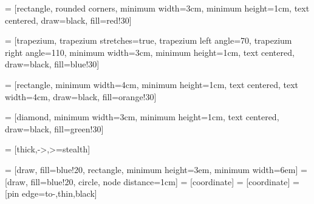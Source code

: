  = [rectangle, rounded corners, 
minimum width=3cm, 
minimum height=1cm,
text centered, 
draw=black, 
fill=red!30]

 = [trapezium, 
trapezium stretches=true, %
trapezium left angle=70, 
trapezium right angle=110, 
minimum width=3cm, 
minimum height=1cm, text centered, 
draw=black, fill=blue!30]

 = [rectangle, 
minimum width=4cm, 
minimum height=1cm, 
text centered, 
text width=4cm, 
draw=black, 
fill=orange!30]

 = [diamond, 
minimum width=3cm, 
minimum height=1cm, 
text centered, 
draw=black, 
fill=green!30]

 = [thick,->,>=stealth]

 = [draw, fill=blue!20, rectangle, 
    minimum height=3em, minimum width=6em]
 = [draw, fill=blue!20, circle, node distance=1cm]
 = [coordinate]
 = [coordinate]
 = [pin edge={to-,thin,black}]